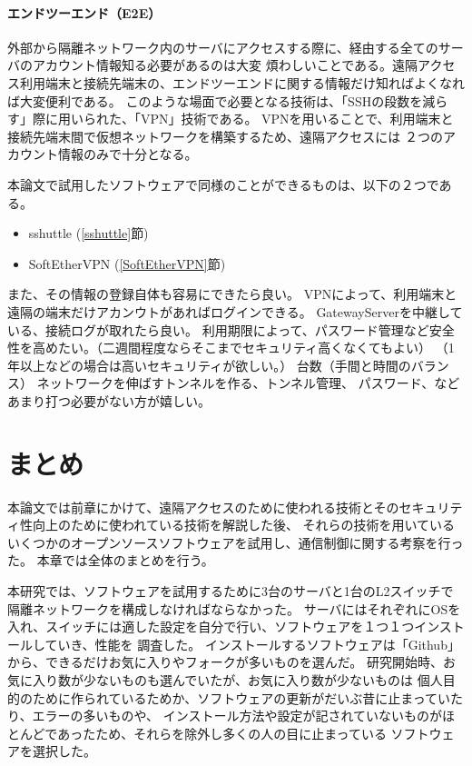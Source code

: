 \documentclass[11pt,a4j,titlepage]{jreport}
\begin{document}
\subsubsection*{エンドツーエンド（E2E）}
外部から隔離ネットワーク内のサーバにアクセスする際に、経由する全てのサーバのアカウント情報知る必要があるのは大変
煩わしいことである。遠隔アクセス利用端末と接続先端末の、エンドツーエンドに関する情報だけ知ればよくなれば大変便利である。
このような場面で必要となる技術は、「SSHの段数を減らす」際に用いられた、「VPN」技術である。
VPNを用いることで、利用端末と接続先端末間で仮想ネットワークを構築するため、遠隔アクセスには
２つのアカウント情報のみで十分となる。

\par 本論文で試用したソフトウェアで同様のことができるものは、以下の２つである。
\begin{itemize}
    \item sshuttle (\ref{sshuttle}節)
    \item SoftEtherVPN (\ref{SoftEtherVPN}節)
\end{itemize}\par

また、その情報の登録自体も容易にできたら良い。
VPNによって、利用端末と遠隔の端末だけアカンウトがあればログインできる。
GatewayServerを中継している、接続ログが取れたら良い。
利用期限によって、パスワード管理など安全性を高めたい。（二週間程度ならそこまでセキュリティ高くなくてもよい）
（1年以上などの場合は高いセキュリティが欲しい。）
台数（手間と時間のバランス）
ネットワークを伸ばすトンネルを作る、トンネル管理、
パスワード、などあまり打つ必要がない方が嬉しい。
\fi


\chapter{まとめ}
本論文では前章にかけて、遠隔アクセスのために使われる技術とそのセキュリティ性向上のために使われている技術を解説した後、
それらの技術を用いているいくつかのオープンソースソフトウェアを試用し、通信制御に関する考察を行った。
本章では全体のまとめを行う。\par
本研究では、ソフトウェアを試用するために3台のサーバと1台のL2スイッチで隔離ネットワークを構成しなければならなかった。
サーバにはそれぞれにOSを入れ、スイッチには適した設定を自分で行い、ソフトウェアを１つ１つインストールしていき、性能を
調査した。
インストールするソフトウェアは「Github」から、できるだけお気に入りやフォークが多いものを選んだ。
研究開始時、お気に入り数が少ないものも選んでいたが、お気に入り数が少ないものは
個人目的のために作られているためか、ソフトウェアの更新がだいぶ昔に止まっていたり、エラーの多いものや、
インストール方法や設定が記されていないものがほとんどであったため、それらを除外し多くの人の目に止まっている
ソフトウェアを選択した。
\end{document}

